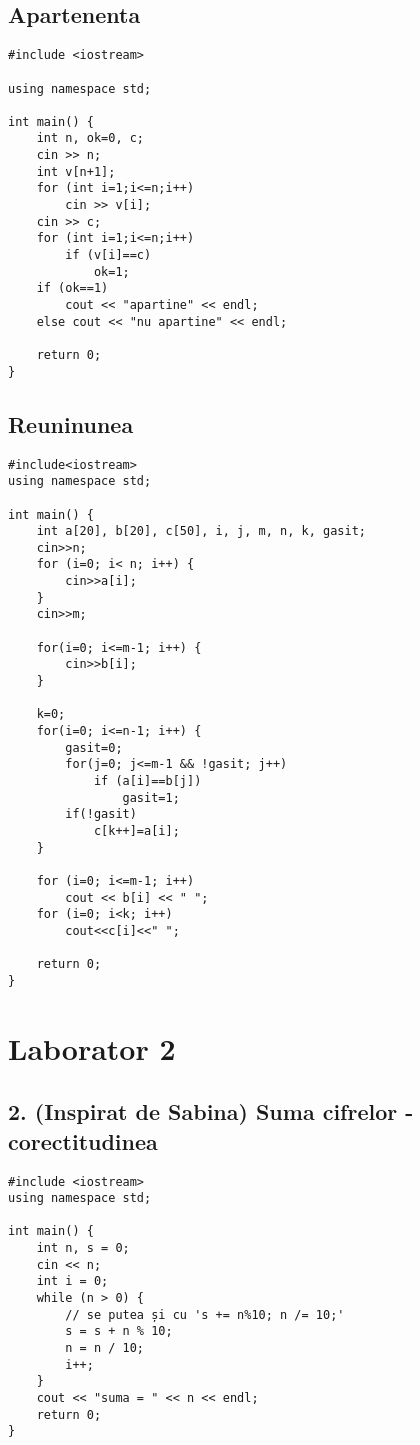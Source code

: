 \documentclass[11pt]{article}
\begin{document}
\subsection*{Apartenenta}
\label{sec:orgd9b6d33}
\begin{verbatim}
#include <iostream>

using namespace std;

int main() {
    int n, ok=0, c;
    cin >> n;
    int v[n+1];
    for (int i=1;i<=n;i++)
        cin >> v[i];
    cin >> c;
    for (int i=1;i<=n;i++)
        if (v[i]==c)
            ok=1;
    if (ok==1)
        cout << "apartine" << endl;
    else cout << "nu apartine" << endl;

    return 0;
}
\end{verbatim}
\subsection*{Reuninunea}
\label{sec:org4fdbce5}
\begin{verbatim}
#include<iostream>
using namespace std;

int main() {
    int a[20], b[20], c[50], i, j, m, n, k, gasit;
    cin>>n;
    for (i=0; i< n; i++) {
        cin>>a[i]; 
    }
    cin>>m;

    for(i=0; i<=m-1; i++) {
        cin>>b[i];
    }

    k=0;
    for(i=0; i<=n-1; i++) {
        gasit=0;
        for(j=0; j<=m-1 && !gasit; j++)
            if (a[i]==b[j])
                gasit=1;
        if(!gasit)
            c[k++]=a[i];
    }

    for (i=0; i<=m-1; i++)
        cout << b[i] << " ";
    for (i=0; i<k; i++)
        cout<<c[i]<<" ";

    return 0;
}
\end{verbatim}

\pagebreak

\section*{Laborator 2}
\label{sec:orgb782ee6}
\subsection*{2. (Inspirat de Sabina) Suma cifrelor - corectitudinea}
\label{sec:orge347d47}

\begin{verbatim}
#include <iostream>
using namespace std;

int main() {
    int n, s = 0;
    cin << n;
    int i = 0;
    while (n > 0) {
        // se putea și cu 's += n%10; n /= 10;'
        s = s + n % 10;
        n = n / 10;
        i++;
    }
    cout << "suma = " << n << endl;
    return 0;
}
\end{verbatim}
\end{document}
